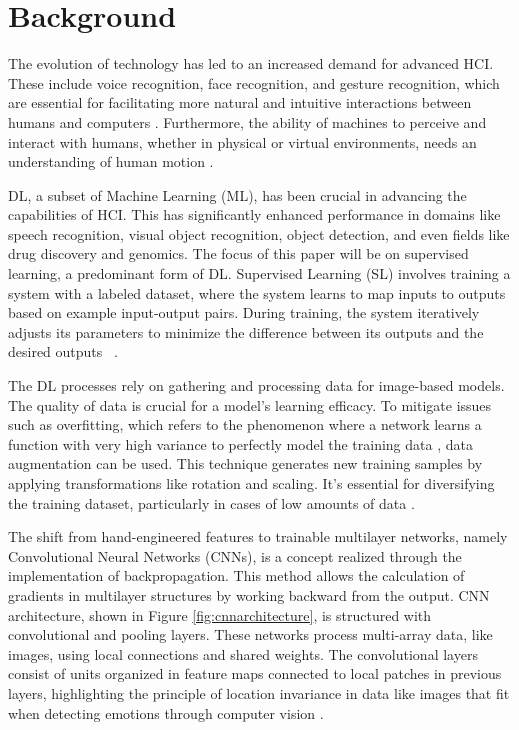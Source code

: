 \documentclass[runningheads]{llncs}
\begin{document}
\section{Background}
\label{sec:background}

The evolution of technology has led to an increased demand for advanced HCI. These include voice recognition, face recognition, and gesture recognition, which are essential for facilitating more natural and intuitive interactions between humans and computers \cite{Alrowais2023}. Furthermore, the ability of machines to perceive and interact with humans, whether in physical or virtual environments, needs an understanding of human motion \cite{Martinez2017}.

DL, a subset of Machine Learning (ML), has been crucial in advancing the capabilities of HCI. This has significantly enhanced performance in domains like speech recognition, visual object recognition, object detection, and even fields like drug discovery and genomics. The focus of this paper will be on supervised learning, a predominant form of DL. Supervised Learning (SL) involves training a system with a labeled dataset, where the system learns to map inputs to outputs based on example input-output pairs. During training, the system iteratively adjusts its parameters to minimize the difference between its outputs and the desired outputs \cite{Lecun2015}~\cite{Mahony2020}.

The DL processes rely on gathering and processing data for image-based models. The quality of data is crucial for a model's learning efficacy. To mitigate issues such as overfitting, which refers to the phenomenon where a network learns a function with very high variance to perfectly model the training data \cite{Shorten2019}, data augmentation can be used. This technique generates new training samples by applying transformations like rotation and scaling. It's essential for diversifying the training dataset, particularly in cases of low amounts of data \cite{Khalifa2022}.

The shift from hand-engineered features to trainable multilayer networks, namely Convolutional Neural Networks (CNNs), is a concept realized through the implementation of backpropagation. This method allows the calculation of gradients in multilayer structures by working backward from the output. CNN architecture, shown in Figure \ref{fig:cnnarchitecture}, is structured with convolutional and pooling layers. These networks process multi-array data, like images, using local connections and shared weights. The convolutional layers consist of units organized in feature maps connected to local patches in previous layers, highlighting the principle of location invariance in data like images that fit when detecting emotions through computer vision \cite{Lecun2015}.
\end{document}
